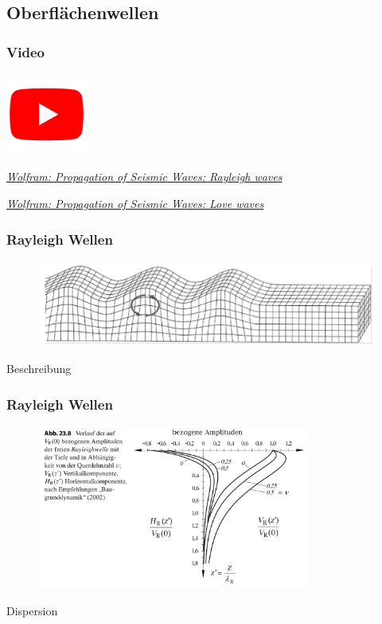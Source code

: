 \subsection{Oberflächenwellen}

\begin{frame}
\frametitle{Video}
\begin{center}
\includegraphics[width=0.2\textwidth]{fig_img/youtube.png}   
\end{center}

\href{https://www.youtube.com/watch?v=6yXgfYHAS7c}{\textsl{Wolfram: Propagation of Seismic Waves: Rayleigh waves}}

\href{https://www.youtube.com/watch?v=t7wJu0Kts7w}{\textsl{Wolfram: Propagation of Seismic Waves: Love waves}}

\end{frame}


\begin{frame}
\frametitle{Rayleigh Wellen}
\begin{figure}
\includegraphics[width=\textwidth]{fig_img/rayleigh_wave} 
\caption*{\cite{Vrettos2017}}
\end{figure}

Beschreibung

\end{frame}


\begin{frame}
\frametitle{Rayleigh Wellen}

\begin{figure}
\includegraphics[width=0.8\textwidth]{fig_img/rayleigh_depth} 
\caption*{\cite{Schmidt2017}}
\end{figure}
Dispersion

\end{frame}


